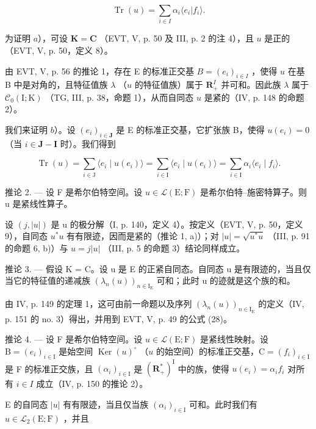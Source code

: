 \[
\operatorname{Tr} (u) = \sum_ {i \in I} \alpha_ {i} \langle e _ {i} | f _ {i} \rangle .
\]

为证明 \(a\)），可设 \(\mathbf{K} = \mathbf{C}\) （EVT, V, p. 50 及 III, p. 2 的注 4），且 \(u\) 是正的（EVT, V, p. 50，定义 8）。

由 EVT, V, p. 56 的推论 1，存在 E 的标准正交基 \(B = (e_i)_{i \in I}\) ，使得 \(u\) 在基 B 中是对角的，且特征值族 \(\lambda\) （\(u\) 的特征值族）属于 \(\mathbf{R}_+^I\) 并可和。因此族 \(\lambda\) 属于 \(\mathcal{C}_0(\mathrm{I};\mathrm{K})\) （TG, III, p. 38，命题 1），从而自同态 \(u\) 是紧的（IV, p. 148 的命题 2）。

我们来证明 \(b\)）。设 \((e_i)_{i \in \mathbf{J}}\) 是 E 的标准正交基，它扩张族 B，使得 \(u(e_i) = 0\) （当 \(i \in \mathbf{J} - \mathbf{I}\) 时）。我们得到

\[
\operatorname{Tr} (u) = \sum_ {i \in \mathrm{J}} \langle e _ {i} \mid u (e _ {i}) \rangle = \sum_ {i \in \mathrm{I}} \langle e _ {i} \mid u (e _ {i}) \rangle = \sum_ {i \in \mathrm{I}} \alpha_ {i} \langle e _ {i} \mid f _ {i} \rangle .
\]

推论 2. --- 设 F 是希尔伯特空间。设 \(u \in \mathcal{L}(\mathrm{E};\mathrm{F})\) 是希尔伯特--施密特算子。则 u 是紧线性算子。

设 \((j,|u|)\) 是 u 的极分解（I, p. 140，定义 4）。按定义（EVT, V, p. 50，定义 9），自同态 \(u^{*}u\) 有有限迹，因而是紧的（推论 1, a)）；对 \(|u|=\sqrt{u^{*}u}\) （III, p. 91 的命题 6, b)）与 \(u=j|u|\) （III, p. 5 的命题 3）结论同样成立。

推论 3. --- 假设 K = C。设 u 是 E 的正紧自同态。自同态 u 是有限迹的，当且仅当它的特征值的递减族 \((\lambda_{n}(u))_{n\in\mathrm{I}_{\mathrm{E}}}\) 可和；此时 u 的迹就是这个族的和。

由 IV, p. 149 的定理 1，这可由前一命题以及序列 \((\lambda_n(u))_{n\in \mathrm{I_E}}\) 的定义（IV, p. 151 的 no. 3）得出，并用到 EVT, V, p. 49 的公式 (28)。

推论 4. --- 设 F 是希尔伯特空间。设 \(u \in \mathcal{L}(\mathrm{E};\mathrm{F})\) 是紧线性映射。设 \(\mathrm{B} = (e_i)_{i \in \mathrm{I}}\) 是始空间 \(\operatorname{Ker}(u)^{\circ}\) （\(u\) 的始空间）的标准正交基，\(\mathrm{C} = (f_i)_{i \in \mathrm{I}}\) 是 F 的标准正交族，且 \((\alpha_{i})_{i\in\mathrm{I}}\) 是 \((\mathbf{R}_{+}^{*})^{\mathrm{I}}\) 中的族，使得 \(u(e_{i})=\alpha_{i}f_{i}\) 对所有 \(i\in I\) 成立（IV, p. 150 的推论 2）。

E 的自同态 \(|u|\) 有有限迹，当且仅当族 \((\alpha_{i})_{i\in \mathrm{I}}\) 可和。此时我们有 \(u\in \mathcal{L}_2(\mathrm{E};\mathrm{F})\) ，并且

